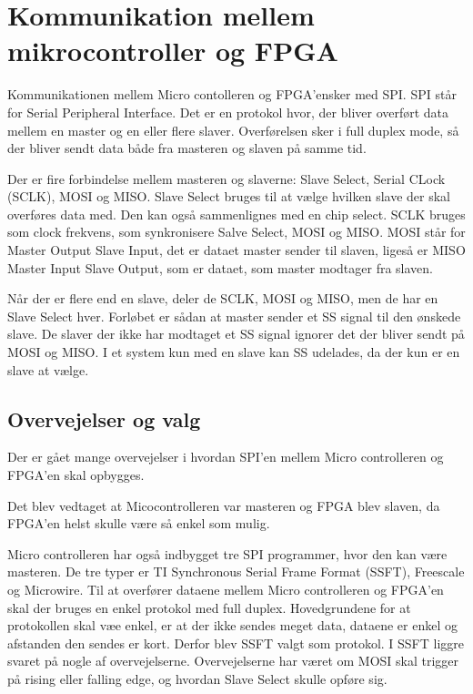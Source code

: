 \section{Kommunikation mellem mikrocontroller og FPGA}

Kommunikationen mellem Micro contolleren og FPGA’ensker med SPI. SPI står for Serial Peripheral Interface. Det er en protokol hvor, der bliver overført data mellem en master og en eller flere slaver. Overførelsen sker i full duplex mode, så der bliver sendt data både fra masteren og slaven på samme tid.

Der er fire forbindelse mellem masteren og slaverne: Slave Select, Serial CLock (SCLK), MOSI og MISO. Slave Select bruges til at vælge hvilken slave der skal overføres data med. Den kan også sammenlignes med en chip select. SCLK bruges som clock frekvens, som synkronisere Salve Select, MOSI og MISO. MOSI står for Master Output Slave Input, det er dataet master sender til slaven, ligeså er MISO Master Input Slave Output, som er dataet, som master modtager fra slaven.

Når der er flere end en slave, deler de SCLK, MOSI og MISO, men de har en Slave Select hver. Forløbet er sådan at master sender et SS signal til den ønskede slave. De slaver der ikke har modtaget et SS signal ignorer det der bliver sendt på MOSI og MISO. I et system kun med en slave kan SS udelades, da der kun er en slave at vælge. 
 

\subsection{Overvejelser og valg}
Der er gået mange overvejelser i hvordan SPI'en mellem Micro controlleren og FPGA'en skal  opbygges.

Det blev vedtaget at Micocontrolleren var masteren og FPGA blev slaven, da FPGA'en helst skulle være så enkel som mulig.

Micro controlleren har også indbygget tre SPI programmer, hvor den kan være masteren. De tre typer er TI Synchronous Serial Frame Format (SSFT), Freescale og Microwire. Til at overfører dataene mellem Micro controlleren og FPGA’en skal der bruges en enkel protokol med full duplex. Hovedgrundene for at protokollen skal væe enkel, er at der ikke sendes meget data, dataene er enkel og afstanden den sendes er kort. Derfor blev SSFT valgt som protokol. I SSFT liggre svaret på nogle af overvejelserne. Overvejelserne har været om MOSI skal trigger på rising eller falling edge, og hvordan Slave Select skulle opføre sig.

